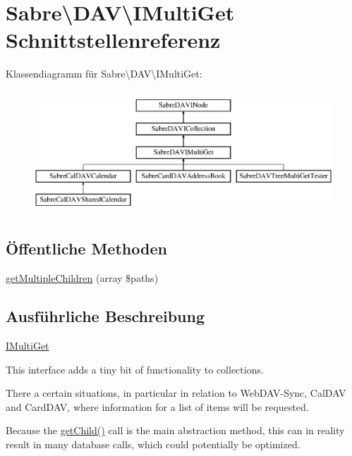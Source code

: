 \hypertarget{interface_sabre_1_1_d_a_v_1_1_i_multi_get}{}\section{Sabre\textbackslash{}D\+AV\textbackslash{}I\+Multi\+Get Schnittstellenreferenz}
\label{interface_sabre_1_1_d_a_v_1_1_i_multi_get}
Klassendiagramm für Sabre\textbackslash{}D\+AV\textbackslash{}I\+Multi\+Get\+:\begin{figure}[H]
\begin{center}
\leavevmode
\includegraphics[height=4.643449cm]{interface_sabre_1_1_d_a_v_1_1_i_multi_get}
\end{center}
\end{figure}
\subsection*{Öffentliche Methoden}
\begin{DoxyCompactItemize}
\item 
\mbox{\hyperlink{interface_sabre_1_1_d_a_v_1_1_i_multi_get_a4d66db5c26d9247511687cd277799528}{get\+Multiple\+Children}} (array \$paths)
\end{DoxyCompactItemize}


\subsection{Ausführliche Beschreibung}
\mbox{\hyperlink{interface_sabre_1_1_d_a_v_1_1_i_multi_get}{I\+Multi\+Get}}

This interface adds a tiny bit of functionality to collections.

There a certain situations, in particular in relation to Web\+D\+A\+V-\/\+Sync, Cal\+D\+AV and Card\+D\+AV, where information for a list of items will be requested.

Because the \mbox{\hyperlink{interface_sabre_1_1_d_a_v_1_1_i_collection_a09f82b07550611752abb149f468b89c2}{get\+Child()}} call is the main abstraction method, this can in reality result in many database calls, which could potentially be optimized.

